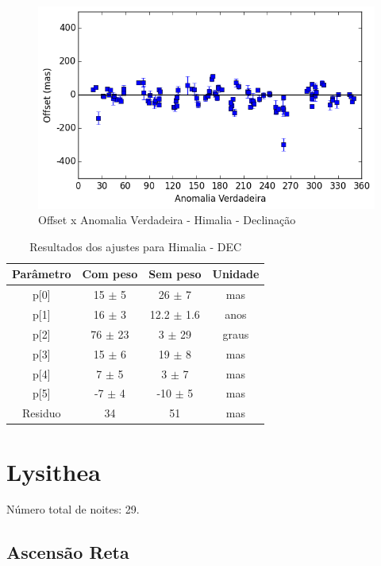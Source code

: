 \documentclass[11pt,a4paper]{report}
\begin{document}
\begin{figure}[h]
\caption{Offset x Anomalia Verdadeira - Himalia - Declinação}
\includegraphics[scale=0.45]{Himalia/DEC_anom.png}  
\end{figure}

\begin{table}[h!]
\caption{\label{Tab: Himalia-DEC} Resultados dos ajustes para Himalia - DEC}
\begin{centering}
\begin{tabular}{cccc}
\hline
\hline
Parâmetro & Com peso & Sem peso & Unidade\tabularnewline
\hline
p[0] & 15 $\pm$ 5 & 26 $\pm$ 7 & mas\\
p[1] & 16 $\pm$ 3 & 12.2 $\pm$ 1.6 & anos\\
p[2] & 76 $\pm$ 23 & 3 $\pm$ 29 & graus\\
p[3] & 15 $\pm$ 6 & 19 $\pm$ 8 & mas\\
p[4] & 7 $\pm$ 5 & 3 $\pm$ 7 & mas\\
p[5] & -7 $\pm$ 4 & -10 $\pm$ 5 & mas\\
Residuo & 34 & 51 & mas\\
\hline 
\end{tabular} 
\par\end{centering}
\end{table}

\chapter*{Lysithea}

\indent \indent Número total de noites: 29.

\section*{Ascensão Reta}
\end{document}
